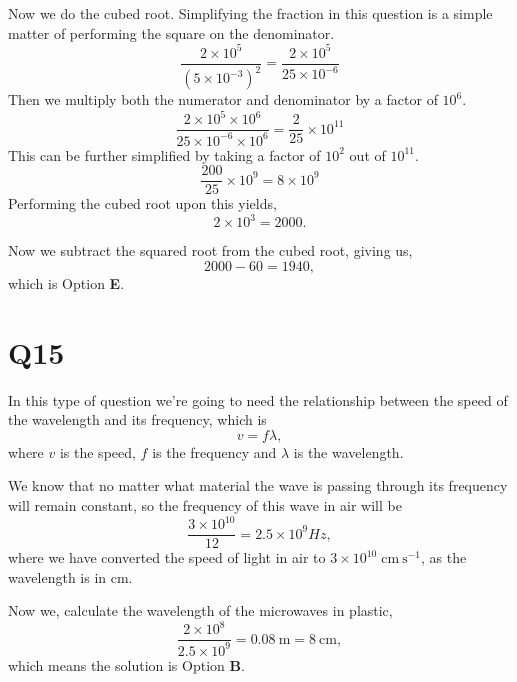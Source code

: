 \documentclass[11pt]{article}
\begin{document}
Now we do the cubed root.  Simplifying the fraction in this question is a simple matter of performing the square on the denominator.
\begin{equation*}
\frac{2 \times 10^5}{(5 \times 10^{-3})^2} = \frac{2 \times 10^5}{25 \times 10^{-6}}
\end{equation*}
Then we multiply both the numerator and denominator by a factor of $10^6$.
\begin{equation*}
\frac{2 \times 10^5 \times 10^6}{25 \times 10^{-6} \times 10^6} = \frac{2}{25} \times 10^{11}
\end{equation*}
This can be further simplified by taking a factor of $10^2$ out of $10^{11}$.
\begin{equation*}
\frac{200}{25}\times 10^9 = 8 \times 10^9
\end{equation*}
Performing the cubed root upon this yields,
\begin{equation*}
2\times 10^3 = 2000.
\end{equation*}

Now we subtract the squared root from the cubed root, giving us,
\begin{equation*}
2000 - 60 = 1940,
\end{equation*}
which is Option \textbf{E}.

\section*{Q15}
In this type of question we're going to need the relationship between the speed of the wavelength and its frequency, which is
\begin{equation*}
v = f \lambda,
\end{equation*}
where $v$ is the speed, $f$ is the frequency and $\lambda$ is the wavelength.

We know that no matter what material the wave is passing through its frequency will remain constant, so the frequency of this wave in air will be
\begin{equation*}
\frac{3\times 10^{10}}{12} = 2.5 \times 10^9 Hz,
\end{equation*}
where we have converted the speed of light in air to $\mathrm{3 \times 10^{10}\; cm\:s^{-1}}$, as the wavelength is in cm.

Now we, calculate the wavelength of the microwaves in plastic,
\begin{equation*}
\frac{2\times10^{8}}{2.5 \times 10^9} = 0.08\: \mathrm{m} = 8\: \mathrm{cm}, 
\end{equation*}
which means the solution is Option \textbf{B}.
\end{document}
